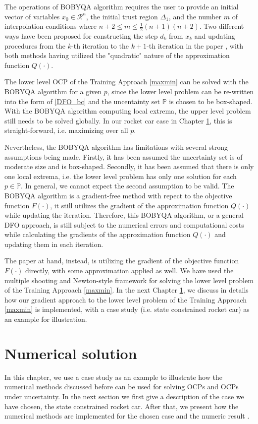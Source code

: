 \documentclass  [
  paper    = a4,
  BCOR     = 10mm,
  twoside,
  fontsize = 12pt,
  fleqn,
  toc      = bibnumbered,
  toc      = listofnumbered,
  numbers  = noendperiod,
  headings = normal,
  listof   = leveldown,
  version  = 3.03
]                                       {scrreprt}
\newcommand{\<}{\langle}
\renewcommand{\>}{\rangle}
\begin{document}
The operations of BOBYQA algorithm requires the user to provide an initial vector of variables $x_0 \in \mathcal{R}^n$, the initial trust region $\Delta_1$, and the number $m$ of interpolation conditions where $n+2 \leq m \leq \frac{1}{2}(n+1)(n+2)$. Two different ways have been proposed for constructing the step $d_k$ from $x_k$ and updating procedures from the $k$-th iteration to the $k+1$-th iteration in the paper \cite{MicPow09}, with both methods having utilized the "quadratic" nature of the approximation function $Q(\cdot)$.

The lower level OCP of the Training Approach \ref{maxmin} can be solved with the BOBYQA algorithm for a given $p$, since the lower level problem can be re-written into the form of \ref{DFO_bc} and the uncentainty set $\mathbb{P}$ is chosen to be box-shaped. With the BOBYQA algorithm computing local extrema, the upper level problem still needs to be solved globally. In our rocket car case in Chapter \ref{Chapter4}, this is straight-forward, i.e. maximizing over all $p$. 

Nevertheless, the BOBYQA algorithm has limitations with several strong assumptions being made. Firstly, it has been assumed the uncertainty set is of moderate size and is box-shaped. Secondly, it has been assumed that there is only one local extrema, i.e. the lower level problem has only one solution for each $p \in \mathbb{P}$. In general, we cannot expect the second assumption to be valid. The BOBYQA algorithm is a gradient-free method with repect to the objective function $F(\cdot)$, it still utilizes the gradient of the approximation function $Q(\cdot)$ while updating the iteration. Therefore, this BOBYQA algorithm, or a general DFO approach, is still subject to the numerical errors and computational costs while calculating the gradients of the approximation function $Q(\cdot)$  and updating them in each iteration.  

The paper at hand, instead, is utilizing the gradient of the objective function $F(\cdot)$ directly, with some approximation applied as well. We have used the multiple shooting and Newton-style framework for solving the lower level problem of the Training Approach \ref{maxmin}. In the next Chapter \ref{Chapter4}, we discuss in details how our gradient approach to the lower level problem of the Training Approach \ref{maxmin} is implemented,  with a case study (i.e. state constrained rocket car) as an example for illustration. 

\chapter{Numerical solution}
\label{Chapter4}
In this chapter, we use a case study as an example to illustrate how the numerical methods discussed before can be used for solving OCPs and OCPs under uncertainty. In the next section we first give a description of the case we have chosen, the state constrained rocket car. After that, we present how the numerical methods are implemented for the chosen case and the numeric result .  
\end{document}
